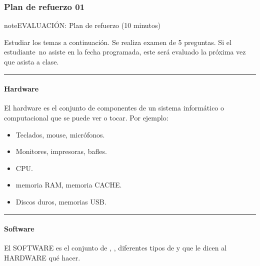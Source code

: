 \documentclass[letterpaper,10pt,spanish]{sphinxmanual}
\begin{document}
\sphinxstepscope


\subsubsection{Plan de refuerzo 01}
\label{\detokenize{cursos/logica8/periodo01/R01:plan-de-refuerzo-01}}\label{\detokenize{cursos/logica8/periodo01/R01::doc}}
\begin{sphinxadmonition}{note}{EVALUACIÓN: Plan de refuerzo (10 minutos)}

\sphinxAtStartPar
Estudiar los temas a continuación. Se realiza examen de 5 preguntas. Si el estudiante no asiste en la fecha programada, este será evaluado la próxima vez que asista a clase.
\end{sphinxadmonition}


\bigskip\hrule\bigskip



\paragraph{Hardware}
\label{\detokenize{cursos/logica8/periodo01/R01:hardware}}
\sphinxAtStartPar
El hardware es el conjunto de componentes de un sistema informático o computacional que se puede ver o tocar. Por ejemplo:
\begin{itemize}
\item {} 
\sphinxAtStartPar
{} Teclados, mouse, micrófonos.

\item {} 
\sphinxAtStartPar
{} Monitores, impresoras, bafles.

\item {} 
\sphinxAtStartPar
{} CPU.

\item {} 
\sphinxAtStartPar
{} memoria RAM, memoria CACHE.

\item {} 
\sphinxAtStartPar
{} Discos duros, memorias USB.

\end{itemize}


\bigskip\hrule\bigskip



\paragraph{Software}
\label{\detokenize{cursos/logica8/periodo01/R01:software}}
\sphinxAtStartPar
El SOFTWARE es el conjunto de , , diferentes tipos de  y  que le dicen al HARDWARE qué hacer.
\end{document}
